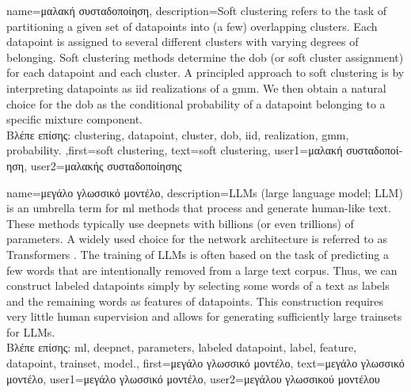 {name={\foreignlanguage{greek}{μαλακή συσταδοποίηση}}, 
	description={Soft \gls{clustering} 
		refers to the task of partitioning a given set of \gls{datapoint}s into (a few) overlapping \gls{cluster}s. 
		Each \gls{datapoint} is assigned to several different \gls{cluster}s with varying degrees of belonging. Soft \gls{clustering} 
		methods determine the \gls{dob} (or soft \gls{cluster} assignment) for each \gls{datapoint} and each \gls{cluster}.
		A principled approach to soft \gls{clustering} is by interpreting \gls{datapoint}s as \gls{iid} \gls{realization}s 
		of a \gls{gmm}. We then obtain a natural choice for the \gls{dob} as the conditional 
		\gls{probability} of a \gls{datapoint} belonging to a specific mixture component.\\
		\foreignlanguage{greek}{Βλέπε επίσης:} \gls{clustering}, \gls{datapoint}, \gls{cluster}, \gls{dob}, \gls{iid}, \gls{realization}, \gls{gmm}, \gls{probability}.
		},first={soft clustering},
		text={soft clustering},
		user1={\foreignlanguage{greek}{μαλακή συσταδοποίηση}}, %
		user2={\foreignlanguage{greek}{μαλακής συσταδοποίησης}} %
}

{name={\foreignlanguage{greek}{μεγάλο γλωσσικό μοντέλο}},
	description={LLMs (large language model; LLM) is an umbrella term for \gls{ml} methods 
		that process and generate human-like text. These methods typically 
		use \gls{deepnet}s with billions (or even trillions) of \gls{parameters}. 
		A widely used choice for the network architecture is referred to as 
		Transformers \cite{vaswani2017attention}. The training of LLMs is often  
		based on the task of predicting a few words that are intentionally removed 
		from a large text corpus. Thus, we can construct \gls{labeled datapoint}s 
		simply by selecting some words of a text as \gls{label}s and the remaining 
		words as \gls{feature}s of \gls{datapoint}s. This construction requires 
		very little human supervision and allows for generating sufficiently 
		large \gls{trainset}s for LLMs.\\
	\foreignlanguage{greek}{Βλέπε επίσης:} \gls{ml}, \gls{deepnet}, \gls{parameters}, \gls{labeled datapoint}, \gls{label}, \gls{feature}, \gls{datapoint}, \gls{trainset}, \gls{model}.},
					first={\foreignlanguage{greek}{μεγάλο γλωσσικό μοντέλο}},
					text={\foreignlanguage{greek}{μεγάλο γλωσσικό μοντέλο}},
					user1={\foreignlanguage{greek}{μεγάλο γλωσσικό μοντέλο}}, %
					user2={\foreignlanguage{greek}{μεγάλου γλωσσικού μοντέλου}} %
}

